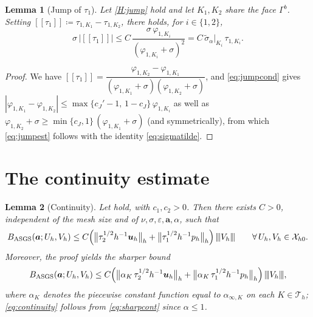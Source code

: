 \documentclass[11pt,a4paper]{article}
\newcommand{\ba}{\boldsymbol{a}}
\newcommand{\buh}{\boldsymbol{u}_h}
\newcommand{\Th}{\mathcal{T}_h}
\newcommand{\Xh}{\mathcal{X}_{h0}}
\newcommand{\jump}[1]{[\![#1]\!]}
\newcommand{\triplenorm}[1]{{\lvert\kern-0.25ex\lvert\kern-0.25ex\lvert #1
\rvert\kern-0.25ex\rvert\kern-0.25ex\rvert}}
\newcommand{\sigmatilde}{\widetilde{\sigma}_{\alpha}}
\theoremstyle{plain}
\newtheorem{lemma}{Lemma}[section]
\theoremstyle{remark}
\theoremstyle{definition}
\numberwithin{equation}{section}
\begin{document}
\begin{lemma}[Jump of $\tau_1$]\label{lem:jump}
Let \cref{H:jump} hold and let $K_1,K_2$ share the face $\Gamma^b$. Setting
$\jump{\tau_1}\coloneqq\tau_{1,K_1}-\tau_{1,K_2}$, there holds, for $i\in\{1,2\}$,
\begin{equation}\label{eq:jumpest}
  \sigma\,\bigl|\jump{\tau_1}\bigr|
  \le C\,\frac{\sigma\,\varphi_{1,K_i}}{(\varphi_{1,K_i}+\sigma)^2}
  = C\,\sigmatilde\big|_{K_i}\,\tau_{1,K_i}.
\end{equation}
\end{lemma}

\begin{proof}
We have
$\jump{\tau_1}
=\dfrac{\varphi_{1,K_2}-\varphi_{1,K_1}}
{(\varphi_{1,K_1}+\sigma)(\varphi_{1,K_2}+\sigma)}$,
and \eqref{eq:jumpcond} gives
$|\varphi_{1,K_1}-\varphi_{1,K_2}|\le
\max\{c_J'-1,\,1-c_J\}\,\varphi_{1,K_i}$ as well as
$\varphi_{1,K_2}+\sigma\ge \min\{c_J,1\}\,(\varphi_{1,K_1}+\sigma)$ (and symmetrically),
from which \eqref{eq:jumpest} follows with the identity \eqref{eq:sigmatilde}.
\end{proof}

\section{The continuity estimate}\label{sec:continuity}

\begin{lemma}[Continuity]\label{lem:continuity}
Let  hold, with $c_1,c_2>0$. Then there exists $C>0$,
independent of the mesh size and of $\nu,\sigma,\varepsilon,\ba,\alpha$, such that
\begin{equation}\label{eq:continuity}
  B_{\mathrm{ASGS}}(\ba; U_h,V_h)
  \le C\Bigl(
  \bigl\lVert\tau_2^{1/2}h^{-1}\buh\bigr\rVert_h
  + \bigl\lVert\tau_1^{1/2}h^{-1}p_h\bigr\rVert_h
  \Bigr)\,\triplenorm{V_h}
  \qquad\forall\, U_h,V_h\in\Xh .
\end{equation}
Moreover, the proof yields the sharper bound
\begin{equation}\label{eq:sharpcont}
  B_{\mathrm{ASGS}}(\ba; U_h,V_h)
  \le C\Bigl(
  \bigl\lVert\alpha_K\,\tau_2^{1/2}h^{-1}\buh\bigr\rVert_h
  + \bigl\lVert\alpha_K\,\tau_1^{1/2}h^{-1}p_h\bigr\rVert_h
  \Bigr)\,\triplenorm{V_h},
\end{equation}
where $\alpha_K$ denotes the piecewise constant function equal to $\alpha_{\infty,K}$ on
each $K\in\Th$; \eqref{eq:continuity} follows from \eqref{eq:sharpcont} since
$\alpha\le 1$.
\end{lemma}
\end{document}
